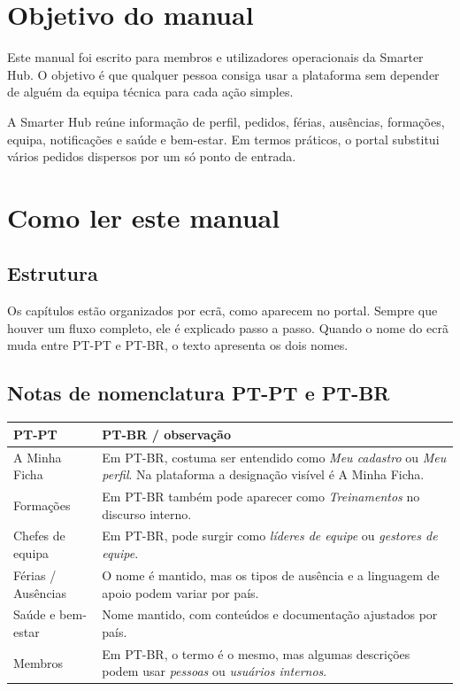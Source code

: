 \chapter{Objetivo do manual}
Este manual foi escrito para membros e utilizadores operacionais da Smarter Hub. O objetivo é que qualquer pessoa consiga usar a plataforma sem depender de alguém da equipa técnica para cada ação simples.

A Smarter Hub reúne informação de perfil, pedidos, férias, ausências, formações, equipa, notificações e saúde e bem-estar. Em termos práticos, o portal substitui vários pedidos dispersos por um só ponto de entrada.

\chapter{Como ler este manual}
\section{Estrutura}
Os capítulos estão organizados por ecrã, como aparecem no portal. Sempre que houver um fluxo completo, ele é explicado passo a passo. Quando o nome do ecrã muda entre PT-PT e PT-BR, o texto apresenta os dois nomes.

\section{Notas de nomenclatura PT-PT e PT-BR}
\begin{longtable}{|p{}|p{}|}
\hline
\textbf{PT-PT} & \textbf{PT-BR / observação} \\
\hline
A Minha Ficha & Em PT-BR, costuma ser entendido como \textit{Meu cadastro} ou \textit{Meu perfil}. Na plataforma a designação visível é A Minha Ficha. \\
\hline
Formações & Em PT-BR também pode aparecer como \textit{Treinamentos} no discurso interno. \\
\hline
Chefes de equipa & Em PT-BR, pode surgir como \textit{líderes de equipe} ou \textit{gestores de equipe}. \\
\hline
Férias / Ausências & O nome é mantido, mas os tipos de ausência e a linguagem de apoio podem variar por país. \\
\hline
Saúde e bem-estar & Nome mantido, com conteúdos e documentação ajustados por país. \\
\hline
Membros & Em PT-BR, o termo é o mesmo, mas algumas descrições podem usar \textit{pessoas} ou \textit{usuários internos}. \\
\hline
\end{longtable}

